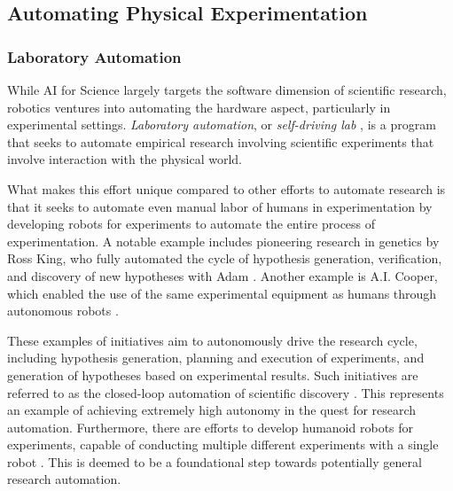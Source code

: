 

\subsection{Automating Physical Experimentation}

\subsubsection{Laboratory Automation}
While AI for Science largely targets the software dimension of scientific research, robotics ventures into automating the hardware aspect, particularly in experimental settings. 
 \textit{Laboratory automation}, or \textit{self-driving lab} \cite{abolhasani2023rise}, is a program that seeks to automate empirical research involving scientific experiments that involve interaction with the physical world.

What makes this effort unique compared to other efforts to automate research is that it seeks to automate even manual labor of humans in experimentation by developing robots for experiments to automate the entire process of experimentation. A notable example includes pioneering research in genetics by Ross King, who fully automated the cycle of hypothesis generation, verification, and discovery of new hypotheses with Adam \cite{king2004functional}. Another example is A.I. Cooper, which enabled the use of the same experimental equipment as humans through autonomous robots \cite{burger2020mobile}. 

These examples of initiatives aim to autonomously drive the research cycle, including hypothesis generation, planning and execution of experiments, and generation of hypotheses based on experimental results. Such initiatives are referred to as the closed-loop automation of scientific discovery     \cite{burger2020mobile,king2004functional}. This represents an example of achieving extremely high autonomy in the quest for research automation. Furthermore, there are efforts to develop humanoid robots for experiments, capable of conducting multiple different experiments with a single robot \cite{yachie2017robotic}. This is deemed to be a foundational step towards potentially general research automation.

